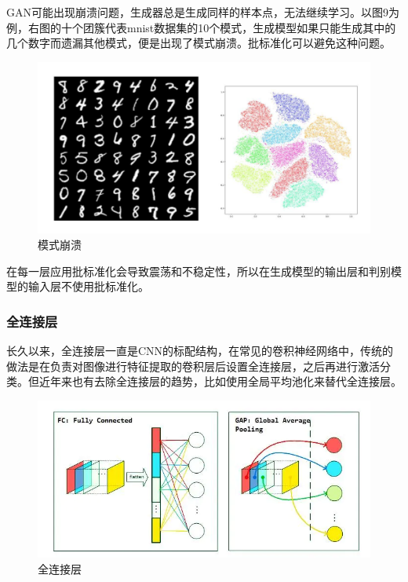 \documentclass[hyperref, a4paper]{ctexart}
\begin{document}
GAN可能出现崩溃问题，生成器总是生成同样的样本点，无法继续学习。以图9为例，右图的十个团簇代表mnist数据集的10个模式，生成模型如果只能生成其中的几个数字而遗漏其他模式，便是出现了模式崩溃。批标准化可以避免这种问题。

\begin{figure}
\centering
\includegraphics{9.png}
\caption{模式崩溃}
\end{figure}

在每一层应用批标准化会导致震荡和不稳定性，所以在生成模型的输出层和判别模型的输入层不使用批标准化。

\hypertarget{ux5168ux8fdeux63a5ux5c42}{%
\subsubsection{全连接层}\label{ux5168ux8fdeux63a5ux5c42}}

长久以来，全连接层一直是CNN的标配结构，在常见的卷积神经网络中，传统的做法是在负责对图像进行特征提取的卷积层后设置全连接层，之后再进行激活分类。但近年来也有去除全连接层的趋势，比如使用全局平均池化来替代全连接层。

\begin{figure}
\centering
\includegraphics{./10.png}
\caption{全连接层}
\end{figure}
\end{document}
